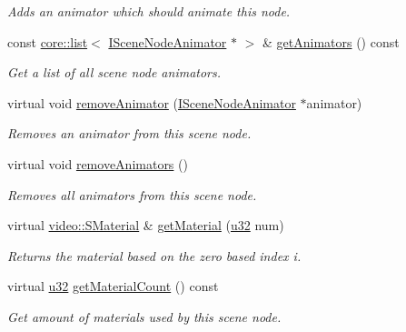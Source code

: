 \begin{DoxyCompactItemize}
\begin{DoxyCompactList}\small\item\em Adds an animator which should animate this node. \end{DoxyCompactList}\item 
const \hyperlink{classirr_1_1core_1_1list}{core\+::list}$<$ \hyperlink{classirr_1_1scene_1_1ISceneNodeAnimator}{I\+Scene\+Node\+Animator} $\ast$ $>$ \& \hyperlink{classirr_1_1scene_1_1ISceneNode_a454fc115d9afa89623c55deba8a4add1}{get\+Animators} () const
\begin{DoxyCompactList}\small\item\em Get a list of all scene node animators. \end{DoxyCompactList}\item 
virtual void \hyperlink{classirr_1_1scene_1_1ISceneNode_aaa67f8f91d4ec99f82955641f1f9e521}{remove\+Animator} (\hyperlink{classirr_1_1scene_1_1ISceneNodeAnimator}{I\+Scene\+Node\+Animator} $\ast$animator)
\begin{DoxyCompactList}\small\item\em Removes an animator from this scene node. \end{DoxyCompactList}\item 
virtual void \hyperlink{classirr_1_1scene_1_1ISceneNode_a28f198bd566e9a7290cbefa531d8d31e}{remove\+Animators} ()
\begin{DoxyCompactList}\small\item\em Removes all animators from this scene node. \end{DoxyCompactList}\item 
virtual \hyperlink{classirr_1_1video_1_1SMaterial}{video\+::\+S\+Material} \& \hyperlink{classirr_1_1scene_1_1ISceneNode_a1f44d8cf753b2e4c17c90d4fc2ed05b2}{get\+Material} (\hyperlink{namespaceirr_a0416a53257075833e7002efd0a18e804}{u32} num)
\begin{DoxyCompactList}\small\item\em Returns the material based on the zero based index i. \end{DoxyCompactList}\item 
virtual \hyperlink{namespaceirr_a0416a53257075833e7002efd0a18e804}{u32} \hyperlink{classirr_1_1scene_1_1ISceneNode_a8e75e9baede63e31e6aa6e42e6c8ddfe}{get\+Material\+Count} () const
\begin{DoxyCompactList}\small\item\em Get amount of materials used by this scene node. \end{DoxyCompactList}\item 

\end{DoxyCompactItemize}

